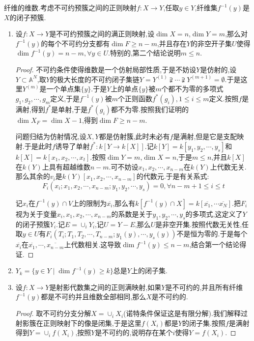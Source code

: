纤维的维数.考虑不可约预簇之间的正则映射$f:X\to Y$,任取$y\in Y$,纤维集$f^{-1}(y)$是$X$的闭子预簇.
\begin{enumerate}
	\item 设$f:X\to Y$是不可约预簇之间的满正则映射,设$\dim X=n$,$\dim Y=m$,那么对$f^{-1}(y)$的每个不可约分支都有$\dim F\ge n-m$,并且存在$Y$的非空开子集$U$使得$\dim f^{-1}(y)=n-m,\forall y\in U$.特别的,第二个结论说明$m\le n$.
	\begin{proof}
		
		不可约条件使得维数是一个仿射局部性质,于是不妨设$Y$是仿射的,设$Y\subset\mathbb{A}^N$,取$Y$的极大长度的不可约闭子集链$Y=Y^{(1)}\supsetneqq\cdots\supsetneqq Y^{(m+1)}=\emptyset$.于是这里$Y^{(m)}$是一个单点集$\{y\}$.于是$Y$上的单点$\{y\}$被$m$个都不为零的多项式$g_1,g_2,\cdots,g_m$定义,于是$f^{-1}(y)$被$m$个正则函数$f^*(g_i),1\le i\le m$定义.按照$f$是满射,得到$f^*$是单射,于是$f^*(g_i)$都不为零.按照我们证明的$\dim X_F=\dim X-1$,得到$\dim F\ge n-m$.
		
		\qquad
		
		问题归结为仿射情况,设$X,Y$都是仿射簇,此时未必有$f$是满射,但是它是支配映射.于是此时$f$诱导了单射$f^*:k[Y\to k[X]]$.记$k[Y]=k[y_1,y_2,\cdots,y_s]$和$k[X]=k[x_1,x_2,\cdots,x_t]$.按照$\dim Y=m$,$\dim X=n$,于是$m\le n$,并且$k[X]$在$k(Y)$上具有超越维数$n-m$.可不妨设$x_1,x_2,\cdots,x_{n-m}$在$k(Y)$上代数无关.那么其余的$v_i$是$k(Y)[x_1,x_2,\cdots,x_{n-m}]$的代数元.于是有关系式:
		$$F_i(x_i;x_1,x_2,\cdots,x_{n-m};y_1,y_2,\cdots,y_s)=0,\forall n-m+1\le i\le t$$
		
		记$x_i$在$f^{-1}(y)\cap V$上的限制为$\overline{x_i}$,那么有$k[f^{-1}(y)\cap X]=k[\overline{x_1},\cdots\overline{x_N}]$.把$F_i$视为关于变量$x_i,x_1,x_2,\cdots,x_{n-m}$的系数是关于$y_1,y_2,\cdots,y_s$的多项式,这定义了$Y$的闭子预簇$Y_i$.记$E=\cup_iY_i$,记$U=Y-E$,那么$U$是非空开集.按照代数无关性,任取$y\in U$有$F_i(T_i;T_1,T_2,\cdots,T_{n-m};y_1(y),\cdots,y_s(y))$不是恒为零的.于是每个$\overline{x_i}$在$\overline{x_1},\cdots,\overline{x_{n-m}}$上代数相关.这导致$\dim f^{-1}(y)\le n-m$,结合第一个结论得证.
	\end{proof}
    \item $Y_k=\{y\in Y\mid\dim f^{-1}(y)\ge k\}$总是$Y$上的闭子集.
    \item 设$f:X\to Y$是射影代数集之间的正则满映射,如果$Y$是不可约的,并且所有纤维$f^{-1}(y)$都是不可约并且维数全部相同,那么$X$是不可约的.
    \begin{proof}
    	
    	取不可约分支分解$X=\cup_iX_i$(诺特条件保证这是有限分解).我们解释过射影簇在正则映射下的像是闭集,于是这里$f(X_i)$都是$Y$的闭子集.按照$f$是满射得到$Y=\cup_if(X_i)$,按照$Y$是不可约的,说明存在某个$i$使得$Y=f(X_i)$.
    	

\end{proof}
\end{enumerate}
